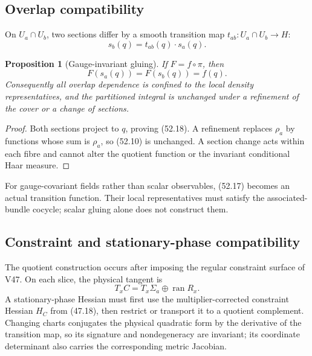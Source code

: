 \documentclass[11pt]{article}
\newtheorem{proposition}[theorem]{Proposition}
\begin{document}
\subsection{Overlap compatibility}

On \(U_a\cap U_b\), two sections differ by a smooth transition map
\(t_{ab}:U_a\cap U_b\to H\):
\[
                         s_b(q)=t_{ab}(q)\cdot s_a(q).         \tag{52.17}
\]

\begin{proposition}[Gauge-invariant gluing]
\label{prop:v11v52-gluing}
If \(F=f\circ\pi\), then
\[
                         F(s_a(q))=F(s_b(q))=f(q).             \tag{52.18}
\]
Consequently all overlap dependence is confined to the local density
representatives, and the partitioned integral is unchanged under a
refinement of the cover or a change of sections.
\end{proposition}

\begin{proof}
Both sections project to \(q\), proving (52.18).  A refinement replaces
\(\rho_a\) by functions whose sum is \(\rho_a\), so (52.10) is
unchanged.  A section change acts within each fibre and cannot alter
the quotient function or the invariant conditional Haar measure.
\end{proof}

For gauge-covariant fields rather than scalar observables, (52.17)
becomes an actual transition function.  Their local representatives
must satisfy the associated-bundle cocycle; scalar gluing alone does
not construct them.

\subsection{Constraint and stationary-phase compatibility}

The quotient construction occurs after imposing the regular constraint
surface of V47.  On each slice, the physical tangent is
\[
 T_xC=
 T_x\Sigma_a\oplus\operatorname{ran}R_x.                      \tag{52.19}
\]
A stationary-phase Hessian must first use the multiplier-corrected
constraint Hessian \(H_C\) from (47.18), then restrict or transport it
to a quotient complement.  Changing charts conjugates the physical
quadratic form by the derivative of the transition map, so its
signature and nondegeneracy are invariant; its coordinate determinant
also carries the corresponding metric Jacobian.
\end{document}
